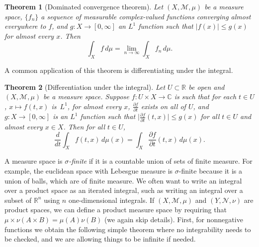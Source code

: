 \documentclass[12pt,openany]{book}
\newcommand{\sabs}[1]{\lvert {#1} \rvert}
\newcommand{\babs}[1]{\bigl\lvert {#1} \bigr\rvert}
\newcommand{\C}{{\mathbb{C}}}
\newcommand{\R}{{\mathbb{R}}}
\newcommand{\sM}{{\mathscr{M}}}
\newcommand{\sN}{{\mathscr{N}}}
\theoremstyle{plain}
\newtheorem{thm}{Theorem}[section]
\theoremstyle{remark}
\theoremstyle{definition}
\theoremstyle{exercise}
\theoremstyle{example}
\begin{document}
\begin{thm}[Dominated convergence theorem]
\pagebreak[2]
Let $(X,\sM,\mu)$ be a measure space,
$\{ f_n \}$ a sequence of measurable complex-valued functions converging
almost everywhere to $f$, and $g \colon X \to [0,\infty]$ an
$L^1$ function such that $\sabs{f(x)} \leq g(x)$ for almost every
$x$.  Then
\begin{equation*}
\int_X f \, d\mu = \lim_{n\to \infty} \int_X f_n \, d\mu .
\end{equation*}
\end{thm}

A common application of this theorem is differentiating
under the integral.

\begin{thm}[Differentiation under the integral]
Let $U \subset \R$ be open and $(X,\sM,\mu)$ be a measure space.
Suppose $f \colon U \times X \to \C$ is such that
for each $t \in U$, $x \mapsto f(t,x)$ is~$L^1$,
for almost every $x$, $\frac{\partial f}{\partial t}$ exists on all of $U$,
and $g \colon X \to [0,\infty]$ is an $L^1$ function such that
$\babs{\frac{\partial f}{\partial t}(t,x)} \leq g(x)$ for all $t \in U$
and almost every $x \in X$.  Then for all $t \in U$,
\begin{equation*}
\frac{d}{dt}
\int_X f(t,x) \, d\mu(x)
=
\int_X
\frac{\partial f}{\partial t}(t,x) \, d\mu(x) .
\end{equation*}
\end{thm}

A measure space is \emph{$\sigma$-finite}
if it is a countable union of sets of
finite measure.  For example, the euclidean space with Lebesgue measure
is $\sigma$-finite because it is a union of balls, which are of finite
measure.  We often want to write an integral over a product space as an
iterated integral, such as writing an integral over a subset of $\R^n$ using
$n$ one-dimensional integrals.  If
$(X,\sM,\mu)$ and $(Y,\sN,\nu)$ are product spaces, we can define a product
measure space by requiring that $\mu \times \nu (A \times B) = \mu(A)\nu(B)$
(we again skip details).  First, for nonnegative functions we obtain the
following simple theorem where no integrability needs to be checked, and we
are allowing things to be infinite if needed.
\end{document}
